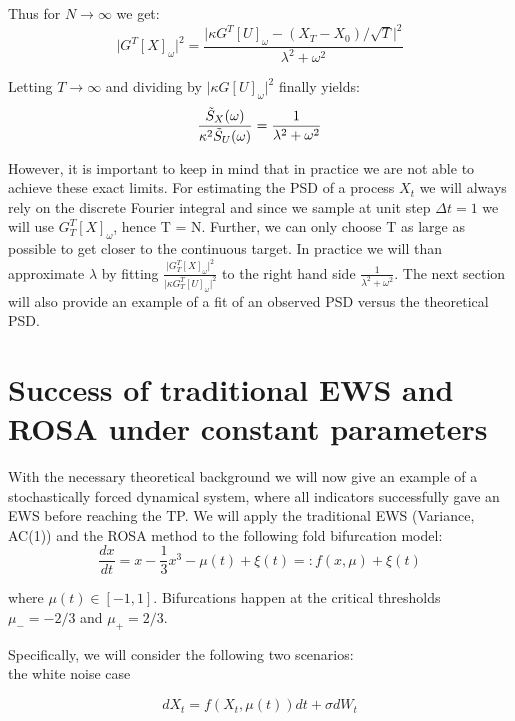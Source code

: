 \documentclass[%
thesis=student,%
coverpage=false,%
titlepage=false,%
headmarks=true, %
english,%
font=libertine, %
math=newpxtx, %
BCOR=5mm,%
coverBCOR=11mm%
]{tumbook}
\begin{document}
Thus for $N \rightarrow \infty$ we get:
\[
    \lvert G^{T}[X]_{\omega} \rvert^2 = \frac{\lvert\kappa G^{T}[U]_{\omega} - (X_{T}-X_{0})/\sqrt{T}\rvert ^2}{\lambda^2 + \omega^2}
\]

Letting $T \rightarrow \infty$ and dividing by $\lvert\kappa G[U]_{\omega}\rvert^2$ finally yields:
\[
    \frac{\Tilde{S}_{X}(\omega)}{\kappa^2\Tilde{S}_{U}(\omega)} = \frac{1}{\lambda^2 + \omega^2}
\]

However, it is important to keep in mind that in practice we are not able to achieve these exact limits. For estimating the PSD of a process $X_{t}$ we will always rely on the discrete Fourier integral and since we sample at unit step $\Delta t = 1$ we will use $G_{T}^{T}[X]_{\omega}$, hence T = N. Further, we can only choose T as large as possible to get closer to the continuous target. In practice we will than approximate $\lambda$ by fitting $\frac{\lvert G_{T}^{T}[X]_{\omega} \rvert ^2}{\lvert \kappa G_{T}^{T}[U]_{\omega} \rvert ^2}$ to the right hand side $\frac{1}{\lambda^2 + \omega^2}$. The next section will also provide an example of a fit of an observed PSD versus the theoretical PSD.





\chapter{Success of traditional EWS and ROSA under constant parameters}

With the necessary theoretical background we will now give an example of a stochastically forced dynamical system, where all indicators successfully gave an EWS before reaching the TP.
We will apply the traditional EWS (Variance, AC(1)) and the ROSA method to the following fold bifurcation model: 
        \[
            \frac{dx}{dt} = x - \frac{1}{3}x^3 - \mu(t) + \xi(t) =: f(x,\mu) + \xi(t)
        \]
        
where $\mu(t) \in [-1,1]$. Bifurcations happen at the critical thresholds $\mu_{-} = -2/3$ and $\mu_{+} = 2/3$.

Specifically, we will consider the following two scenarios: \\
    the white noise case
    
    \begin{equation}  
    dX_{t} = f(X_{t},\mu(t))dt + \sigma dW_{t}
    \label{successful application white noise}
    \end{equation}
\end{document}
